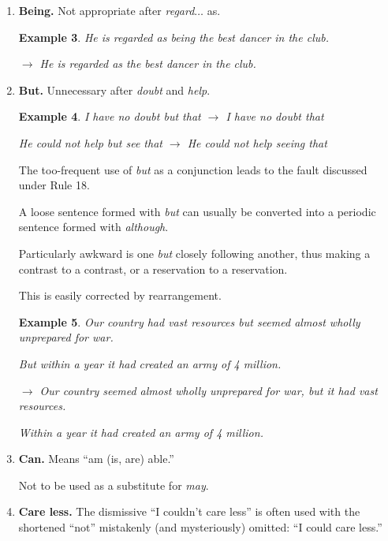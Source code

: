 \documentclass{article}
\newtheorem{example}{Example}
\begin{document}
\begin{enumerate}
\begin{example}
		$\to$ No agreement has yet been reached.
	\end{example}
	The chief exception is at the beginning of a sentence, where {\it yet} means something different.
	\begin{example}
		Yet (\emph{or} despite everything) he has not succeeded.
		
		As yet (\emph{or} so far) he has not succeeded.
	\end{example}
	\item {\bf Being.} Not appropriate after {\it regard$\ldots$} as.
	\begin{example}
		He is regarded as being the best dancer in the club.
		
		$\to$ He is regarded as the best dancer in the club.
	\end{example}
	\item {\bf But.} Unnecessary after {\it doubt} and {\it help}.
	\begin{example}
		I have no doubt but that $\to$ I have no doubt that
		
		He could not help but see that $\to$ He could not help seeing that
	\end{example}
	The too-frequent use of {\it but} as a conjunction leads to the fault discussed under Rule 18.
	
	A loose sentence formed with {\it but} can usually be converted into a periodic sentence formed with {\it although}.
	
	Particularly awkward is one {\it but} closely following another, thus making a contrast to a contrast, or a reservation to a reservation.
	
	This is easily corrected by rearrangement.
	\begin{example}
		Our country had vast resources but seemed almost wholly unprepared for war.
		
		But within a year it had created an army of 4 million.
		
		$\to$ Our country seemed almost wholly unprepared for war, but it had vast resources.
		
		Within a year it had created an army of 4 million.
	\end{example}
	\item {\bf Can.} Means ``am (is, are) able.''
	
	Not to be used as a substitute for {\it may}.
	\item {\bf Care less.} The dismissive ``I couldn't care less'' is often used with the shortened ``not'' mistakenly (and mysteriously) omitted: ``I could care less.''
	

\end{enumerate}
\end{document}
